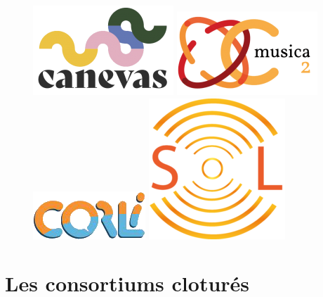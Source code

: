 \documentclass[
  letterpaper,
  DIV=11,
  numbers=noendperiod]{scrreport}
\begin{document}
\begin{figure}
\newline
\begin{minipage}{0.33\linewidth}
\includegraphics{IMG/logo-canevas_png-200x127.png}\end{minipage}%
%
\begin{minipage}{0.33\linewidth}
\includegraphics{IMG/Musica-2-1-200x119.png}\end{minipage}%
%
\begin{minipage}{0.33\linewidth}
\includegraphics{IMG/logo-CORLI-png.png}\end{minipage}%
\newline
\begin{minipage}{0.33\linewidth}
\includegraphics{IMG/logo-sol-picto-194x200.png}\end{minipage}%

\end{figure}%

\chapter{Les consortiums cloturés}\label{les-consortiums-cloturuxe9s}
\end{document}
